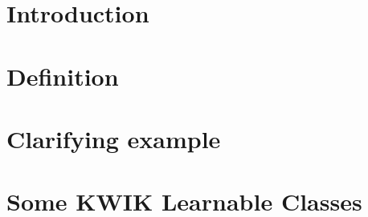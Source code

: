 \documentclass[twoside]{project}
\date{\today}
\begin{document}
\maketitle

\section*{Introduction}

\section*{Definition}


\section*{Clarifying example}


\section*{Some KWIK Learnable Classes}


\section*{}


{}

\end{document}
